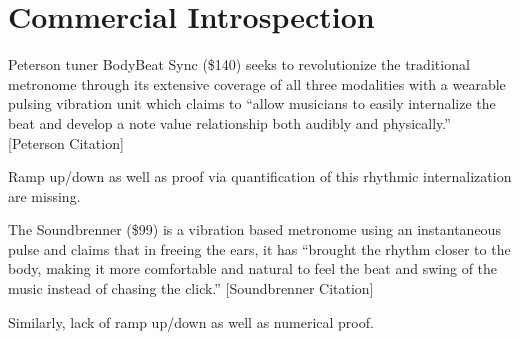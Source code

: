 \section{Commercial Introspection}
Peterson tuner BodyBeat Sync (\$140) seeks to revolutionize the traditional metronome through its extensive coverage of all three modalities with a wearable pulsing vibration unit which claims to “allow musicians to easily internalize the beat and develop a note value relationship both audibly and physically.” [Peterson Citation]

Ramp up/down as well as proof via quantification of this rhythmic internalization are missing.

The Soundbrenner (\$99) is a vibration based metronome using an instantaneous pulse and claims that in freeing the ears, it has “brought the rhythm closer to the body, making it more comfortable and natural to feel the beat and swing of the music instead of chasing the click.” [Soundbrenner Citation]

Similarly, lack of ramp up/down as well as numerical proof.
